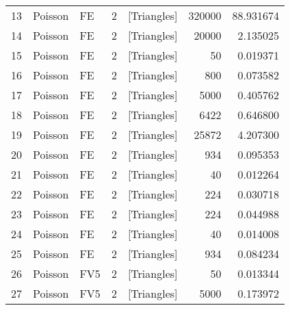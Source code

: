 \begin{tabular}{lllrlrr}
13 &   Poisson &                    FE &               2 &    [Triangles] &                   320000 &                        88.931674 \\
14 &   Poisson &                    FE &               2 &    [Triangles] &                    20000 &                         2.135025 \\
15 &   Poisson &                    FE &               2 &    [Triangles] &                       50 &                         0.019371 \\
16 &   Poisson &                    FE &               2 &    [Triangles] &                      800 &                         0.073582 \\
17 &   Poisson &                    FE &               2 &    [Triangles] &                     5000 &                         0.405762 \\
18 &   Poisson &                    FE &               2 &    [Triangles] &                     6422 &                         0.646800 \\
19 &   Poisson &                    FE &               2 &    [Triangles] &                    25872 &                         4.207300 \\
20 &   Poisson &                    FE &               2 &    [Triangles] &                      934 &                         0.095353 \\
21 &   Poisson &                    FE &               2 &    [Triangles] &                       40 &                         0.012264 \\
22 &   Poisson &                    FE &               2 &    [Triangles] &                      224 &                         0.030718 \\
23 &   Poisson &                    FE &               2 &    [Triangles] &                      224 &                         0.044988 \\
24 &   Poisson &                    FE &               2 &    [Triangles] &                       40 &                         0.014008 \\
25 &   Poisson &                    FE &               2 &    [Triangles] &                      934 &                         0.084234 \\
26 &   Poisson &                   FV5 &               2 &    [Triangles] &                       50 &                         0.013344 \\
27 &   Poisson &                   FV5 &               2 &    [Triangles] &                     5000 &                         0.173972 \\

\end{tabular}
